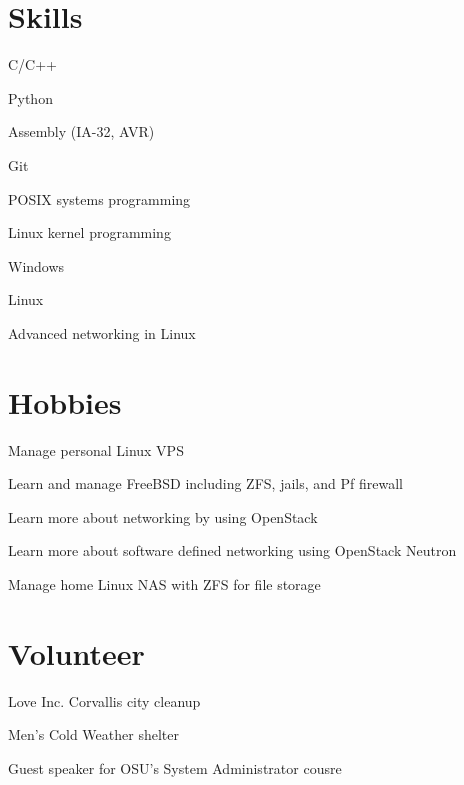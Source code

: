 \documentclass[margin,line]{resume}
\begin{document}
\begin{resume}
    \section{\mysidestyle Skills}
    \begin{list2}
    \item C/C++
    \item Python
    \item Assembly (IA-32, AVR)
    \item Git
    \item POSIX systems programming
    \item Linux kernel programming
    \item Windows
    \item Linux
    \item Advanced networking in Linux\\
    \end{list2}\vspace{-1.5mm}

    \section{\mysidestyle Hobbies}
    \begin{list2}
    \item Manage personal Linux VPS
    \item Learn and manage FreeBSD including ZFS, jails, and Pf firewall
    \item Learn more about networking by using OpenStack
    \item Learn more about software defined networking using OpenStack Neutron
    \item Manage home Linux NAS with ZFS for file storage\\
    \end{list2}\vspace{-1.5mm}


    \section{\mysidestyle Volunteer}
    \begin{list2}
    \item Love Inc. Corvallis city cleanup
    \item Men's Cold Weather shelter
    \item Guest speaker for OSU's System Administrator cousre
    \end{list2}\vspace{-1.5mm}


\end{resume}
\end{document}
